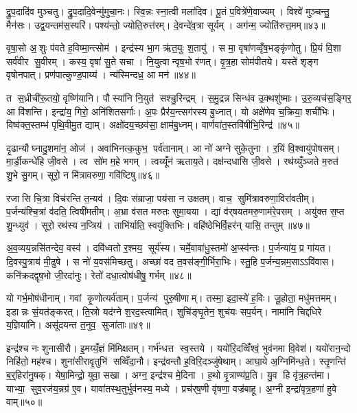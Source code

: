 द्रु॒प॒दादि॑व मुञ्चतु। द्रु॒प॒दादि॒वेन्मु॑मुचा॒नः। स्वि॒न्नः स्ना॒त्वी मला॑दिव। पू॒तं प॒वित्रे॑णे॒वाज्यम्। विश्वे॑ मुञ्चन्तु॒ मैन॑सः। उद्व॒यन्तम॑स॒स्परि॑। पश्य॑न्तो॒ ज्योति॒रुत्त॑रम्। दे॒वन्दे॑व॒त्रा सूर्यम्। अग॑न्म॒ ज्योति॑रुत्त॒मम्॥४३॥\anuvakamend[तव॑ कृधि॒ वन॒स्पतीञ्जानता॒मस॑ति व॒यं भ॑रादित्याश्च॒ नव॑ च]

वृषा॒सो अ॒शुः प॑वते ह॒विष्मा॒न्त्सोम॑। इन्द्र॑स्य भा॒ग ऋ॑त॒युः श॒तायु॑। स मा॒ वृषा॑णव्वृँष॒भङ्कृ॑णोतु। प्रि॒यं वि॒शा सर्व॑वीर सु॒वीरम्। कस्य॒ वृषा॑ सु॒ते सचा। नि॒युत्वान्वृष॒भो र॑णत्। वृ॒त्र॒हा सोम॑पीतये। यस्ते॑ शृङ्ग वृषोनपात्। प्रण॑पात्कुण्ड॒पाय्य॑। न्य॑स्मिन्दध्र॒ आ मन॑॥४४॥

त स॒ध्रीची॑रू॒तयो॒ वृष्णि॑यानि। पौस्या॑नि नि॒युत॑ सश्चु॒रिन्द्रम्। स॒मु॒द्रन्न सिन्ध॑व उ॒क्थशु॑ष्माः। उ॒रु॒व्यच॑स॒ङ्गिर॒ आ वि॑शन्ति। इन्द्रा॑य॒ गिरो॒ अनि॑शितसर्गाः। अ॒पः प्रैर॑य॒न्त्सग॑रस्य बु॒ध्नात्। यो अक्षे॑णेव च॒क्रिया॒ शची॑भिः। विष्व॑क्त॒स्तम्भ॑ पृथि॒वीमु॒त द्याम्। अक्षो॑दय॒च्छव॑सा॒ क्षाम॑बु॒ध्नम्। वार्णवा॑त॒स्तवि॑षीभि॒रिन्द्र॑॥४५॥

दृ॒ढान्यौघ्नादु॒शमा॑न॒ ओज॑। अवा॑भिनत्क॒कुभ॒ पर्व॑तानाम्। आ नो॑ अग्ने सुके॒तुना। र॒यिं वि॒श्वायु॑पोषसम्। मा॒र्डी॒कन्धे॑हि जी॒वसे। त्व सो॑म म॒हे भगम्। त्वय्यूँन॑ ऋताय॒ते। दक्ष॑न्दधासि जी॒वसे। रथ॑य्युँञ्जते म॒रुत॑ शु॒भे सु॒गम्। सूरो॒ न मि॑त्रावरुणा॒ गवि॑ष्टिषु॥४६॥

रजासि चि॒त्रा विच॑रन्ति त॒न्यव॑। दि॒वः स॑म्राजा॒ पय॑सा न उक्षतम्। वाच॒ सुमि॑त्रावरुणा॒विरा॑वतीम्। प॒र्जन्य॑श्चि॒त्रां व॑दति॒ त्विषी॑मतीम्। अ॒भ्रा व॑सत मरुतः सुमा॒यया। द्यां व॑र्‌षयतमरु॒णाम॑रे॒पसम्। अयु॑क्त स॒प्त शु॒न्ध्युव॑। सूरो॒ रथ॑स्य न॒प्त्रिय॑। ताभि॑र्याति॒ स्वयु॑क्तिभिः। वहि॑ष्ठेभिर्\mbox{}वि॒हर॑न् यासि॒ तन्तुम्॥४७॥

अ॒व॒व्यय॒न्नसि॑तन्देव॒ वस्व॑। दवि॑ध्वतो र॒श्मय॒ सूर्य॑स्य। चर्मे॒वावा॑धु॒स्तमो॑ अ॒प्स्व॑न्तः। प॒र्जन्या॑य॒ प्र गा॑यत। दि॒वस्पु॒त्राय॑ मी॒ढुषे। स नो॑ य॒वस॑मिच्छतु। अच्छा॑ वद त॒वस॑ङ्गी॒र्भिरा॒भिः। स्तु॒हि प॒र्जन्य॒न्नम॒साऽऽवि॑वास। कनि॑क्रदद्वृष॒भो जी॒रदा॑नुः। रेतो॑ दधा॒त्वोष॑धीषु॒ गर्भम्॥४८॥

यो गर्भ॒मोष॑धीनाम्। गवां कृ॒णोत्यर्व॑ताम्। प॒र्जन्य॑ पुरु॒षीणाम्। तस्मा॒ इदा॒स्ये॑ ह॒विः। जू॒होता॒ मधु॑मत्तमम्। इडान्नः सं॒यत॑ङ्करत्। ति॒स्रो यद॑ग्ने श॒रद॒स्त्वामित्। शुचि॑ङ्घृ॒तेन॒ शुच॑यः सप॒र्यन्। नामा॑नि चिद्दधिरे य॒ज्ञिया॑नि। असू॑दयन्त त॒नुव॒ सुजा॑ताः॥४९॥

इन्द्र॑श्च नः शुनासीरौ। इ॒मय्यँ॒ज्ञं मि॑मिक्षतम्। गर्भ॑न्धत्त स्व॒स्तये। ययो॑रि॒दव्विँश्वं॒ भुव॑नमा वि॒वेश॑। ययो॑रान॒न्दो निहि॑तो॒ मह॑श्च। शुना॑सीरावृ॒तुभि॑ सव्विँदा॒नौ। इन्द्र॑वन्तौ ह॒विरि॒दञ्जु॑षेथाम्। आघा॒ये अ॒ग्निमि॑न्ध॒ते। स्तृ॒णन्ति॑ ब॒र्॒हिरा॑नु॒षक्। येषा॒मिन्द्रो॒ युवा॒ सखा। अग्न॒ इन्द्र॑श्च मे॒दिना। ह॒थो वृ॒त्राण्य॑प्र॒ति। यु॒व हि वृ॑त्र॒हन्त॑मा। याभ्या॒ सुव॒रज॑य॒न्नग्र॑ ए॒व। यावा॑तस्थ॒तुर्भुव॑नस्य॒ मध्ये। प्रच॑र्‌ष॒णी वृ॑षणा॒ वज्र॑बाहू। अ॒ग्नी इन्द्रा॑वृत्र॒हणा॑ हुवे वाम्॥५०॥\anuvakamend[मन॒ इन्द्रो॒ गवि॑ष्टिषु॒ तन्तु॒ङ्गर्भ॒ सुजा॑ता॒ सखा॑ स॒प्त च॑]

